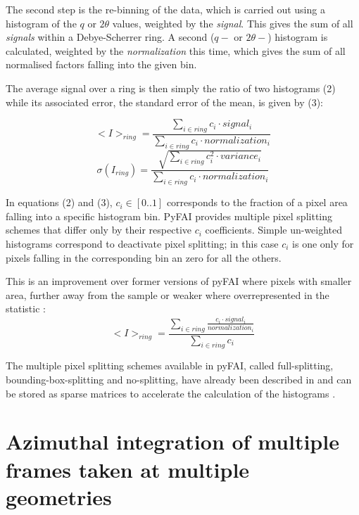 \documentclass[preprint]{iucr}              %
\begin{document}
The second step is the re-binning of the data, which is carried out 
using a histogram of the $q$ or $2\theta$ values, weighted by the
\textit{signal}.
This gives the sum of all \textit{signals} within a Debye-Scherrer ring.
A second ($q-$ or $2\theta-$) histogram is calculated, weighted
by the \textit{normalization} this time, which gives the sum of all
normalised factors falling into the given bin.

The average signal over a ring is then simply the ratio of two histograms (2) 
while its associated error, the standard error of the mean, is given by (3):

\begin{equation}
<I>_{ring} = \frac{\sum\limits_{i \in ring} c_i \cdot signal_i}
                  {\sum\limits_{i \in ring} c_i \cdot normalization_i} 
\end{equation}
\begin{equation}
\sigma(I_{ring}) = \frac{\sqrt{\sum\limits_{i \in ring} c_i^2 \cdot variance_i}}
                  {\sum\limits_{i \in ring} c_i \cdot normalization_i} 
\end{equation}

In equations (2) and (3), $c_i \in [0..1]$ corresponds to the fraction of a pixel area 
falling into a specific histogram bin. 
PyFAI provides multiple pixel splitting schemes that differ only by their
respective $c_i$ coefficients. 
Simple un-weighted histograms correspond to deactivate pixel splitting; in this
case $c_i$ is one only for pixels falling in the corresponding bin an zero for all
the others.

This is an improvement over former versions of pyFAI where pixels with
smaller area, further away from the sample or weaker where overrepresented in
the statistic :
\begin{equation}
<I>_{ring} = \frac{\sum\limits_{i \in ring} \frac{ c_i \cdot
signal_i}{normalization_i}} {\sum\limits_{i \in ring} c_i} 
\end{equation}

The multiple pixel splitting schemes available in pyFAI, called full-splitting, 
bounding-box-splitting and no-splitting, have already been described in
  and can be stored as sparse matrices to accelerate the
 calculation of the histograms \cite{kieffer_ashiotis-proc-euroscipy-2014}.

\section{Azimuthal integration of multiple frames taken at multiple geometries}
\end{document}
